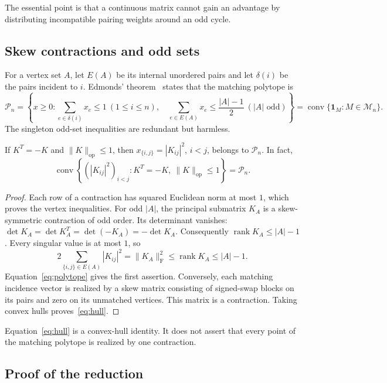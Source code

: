 \documentclass[11pt]{article}
\newcommand{\F}{\mathrm F}
\newcommand{\op}{\mathrm{op}}
\newcommand{\cM}{\mathcal M}
\newcommand{\cP}{\mathcal P}
\DeclareMathOperator{\conv}{conv}
\DeclareMathOperator{\rank}{rank}
\begin{document}
The essential point is that a continuous matrix cannot gain an advantage
by distributing incompatible pairing weights around an odd cycle.

\subsection{Skew contractions and odd sets}

For a vertex set $A$, let $E(A)$ be its internal unordered pairs and let
$\delta(i)$ be the pairs incident to $i$. Edmonds' theorem~\cite{edmonds}
states that the matching polytope is
\begin{equation}\label{eq:polytope}
 \cP_n=\left\{x\geq0:
  \sum_{e\in\delta(i)}x_e\leq1\ (1\leq i\leq n),\quad
  \sum_{e\in E(A)}x_e\leq\frac{|A|-1}{2}\ (|A|\text{ odd})\right\}
 =\conv\{\mathbf1_M:M\in\cM_n\}.
\end{equation}
The singleton odd-set inequalities are redundant but harmless.

\begin{lemma}\label{lem:skew}
If $K^T=-K$ and $\|K\|_\op\leq1$, then
$x_{\{i,j\}}=|K_{ij}|^2$, $i<j$, belongs to $\cP_n$. In fact,
\begin{equation}\label{eq:hull}
 \conv\left\{(|K_{ij}|^2)_{i<j}:K^T=-K,\ \|K\|_\op\leq1\right\}
 =\cP_n.
\end{equation}
\end{lemma}
\begin{proof}
Each row of a contraction has squared Euclidean norm at most $1$,
which proves the vertex inequalities. For odd $|A|$, the principal
submatrix $K_A$ is a skew-symmetric contraction of odd order. Its
determinant vanishes: $\det K_A=\det K_A^T=\det(-K_A)=-\det K_A$.
Consequently $\rank K_A\leq|A|-1$. Every singular value is at most $1$,
so
\[
 2\sum_{\{i,j\}\in E(A)}|K_{ij}|^2
 =\|K_A\|_\F^2\leq\rank K_A\leq|A|-1.
\]
Equation~\eqref{eq:polytope} gives the first assertion. Conversely, each
matching incidence vector is realized by a skew matrix consisting of
signed-swap blocks on its pairs and zero on its unmatched vertices. This
matrix is a contraction. Taking convex hulls proves~\eqref{eq:hull}.
\end{proof}

Equation~\eqref{eq:hull} is a convex-hull identity. It does not assert
that every point of the matching polytope is realized by one contraction.

\subsection{Proof of the reduction}
\end{document}
